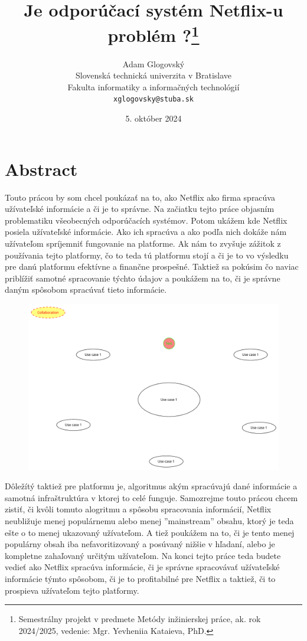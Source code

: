 \documentclass[10pt,twoside,slovak,a4paper]{article}
\title{Je odporúčací systém Netflix-u problém ?\thanks{Semestrálny projekt v predmete Metódy inžinierskej práce, ak. rok 2024/2025, vedenie: Mgr. Yevheniia Kataieva, PhD.}}
\author{Adam Glogovský\\[2pt]
	{\small Slovenská technická univerzita v Bratislave}\\
	{\small Fakulta informatiky a informačných technológií}\\
	{\small \texttt{xglogovsky@stuba.sk}}}
\date{\small 5. október 2024}
\begin{document}
\maketitle

\section*{Abstract}
Touto prácou by som chcel poukázať na to, ako Netflix ako firma spracúva užívateľské informácie a či je to správne. Na začiatku tejto práce objasním problematiku všeobecných odporúčacích systémov. Potom ukážem kde Netflix posiela užívateľské informácie. Ako ich spracúva a ako podľa nich dokáže nám užívateľom spríjemniť fungovanie na platforme. Ak nám to zvyšuje zážitok z používania tejto platformy, čo to teda tú platformu stojí a či je to vo výsledku pre danú platformu efektívne a finančne prospešné. Taktiež sa pokúsim čo naviac priblížiť samotné spracovanie týchto údajov a poukážem na to, či je správne daným spôsobom spracúvať tieto informácie.\cite{amatriain2015recommender}
\begin{figure}[h]
	\centering
	\includegraphics[scale=0.2]{diagram.pdf}
\end{figure}
Dôležítý taktiež pre platformu je, algoritmus akým spracúvajú dané informácie a samotná infraštruktúra v ktorej to celé funguje. Samozrejme touto prácou chcem zistiť, či kvôli tomuto alogritmu a spôsobu spracovania informácií, Netflix neubližuje menej populárnemu alebo menej ''mainstream'' obsahu, ktorý je teda ešte o to menej ukazovaný užívateľom. A tiež poukážem na to, či je tento menej populárny obsah iba nefavoritizovaný a posúvaný nižšie v hľadaní, alebo je kompletne zahaľovaný určitým užívateľom. Na konci tejto práce teda budete vedieť ako Netflix spracúva informácie, či je správne spracovávať užívateľské informácie týmto spôsobom, či je to profitabilné pre Netflix a taktiež, či to prospieva užívateľom tejto platformy.
\end{document}
